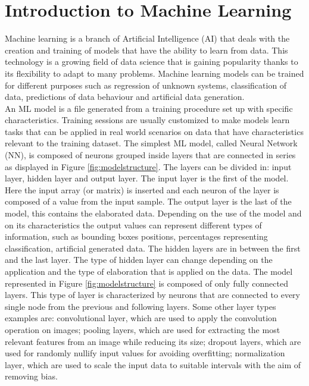 \documentclass[12pt]{report}
\begin{document}
\section{Introduction to Machine Learning}
Machine learning is a branch of Artificial Intelligence (AI) that deals with the creation and training of models that have the ability to learn from data. This technology is a growing field of data science that is gaining popularity thanks to its flexibility to adapt to many problems. Machine learning models can be trained for different purposes such as regression of unknown systems, classification of data, predictions of data behaviour and artificial data generation.\\
An ML model is a file generated from a training procedure set up with specific characteristics. Training sessions are usually customized to make models learn tasks that can be applied in real world scenarios on data that have characteristics relevant to the training dataset. The simplest ML model, called Neural Network (NN), is composed of neurons grouped inside layers that are connected in series as displayed in Figure \ref{fig:modelstructure}. The layers can be divided in: input layer, hidden layer and output layer. 
The input layer is the first of the model. Here the input array (or matrix) is inserted and each neuron of the layer is composed of a value from the input sample. 
The output layer is the last of the model, this contains the elaborated data. Depending on the use of the model and on its characteristics the output values can represent different types of information, such as bounding boxes positions, percentages representing classification, artificial generated data.
The hidden layers are in between the first and the last layer. The type of hidden layer can change depending on the application and the type of elaboration that is applied on the data. The model represented in  Figure \ref{fig:modelstructure} is composed of only fully connected layers. This type of layer is characterized by neurons that are connected to every single node from the previous and following layers. Some other layer types examples are: convolutional layer, which are used to apply the convolution operation on images; pooling layers, which are used for extracting the most relevant features from an image while reducing its size; dropout layers, which are used for randomly nullify input values for avoiding overfitting; normalization layer, which are used to scale the input data to suitable intervals with the aim of removing bias. \\
\end{document}
